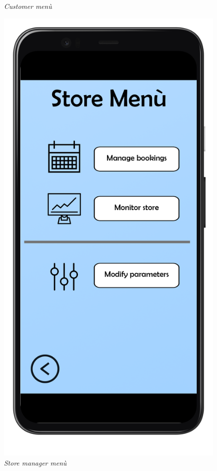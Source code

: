 \documentclass{article}
\begin{document}
\begin{figure}[!h]
\begin{minipage}[!h]{0.4\textwidth}
				\caption{\emph{Customer menù}}
			\end{minipage}
			\hfill
			\begin{minipage}[!h]{0.4\textwidth}
				\includegraphics[width=\textwidth]{../Mockups/MenuStore.png}
				\caption{\emph{Store manager menù}}
			\end{minipage}
		\end{figure}		
		
\end{document}
